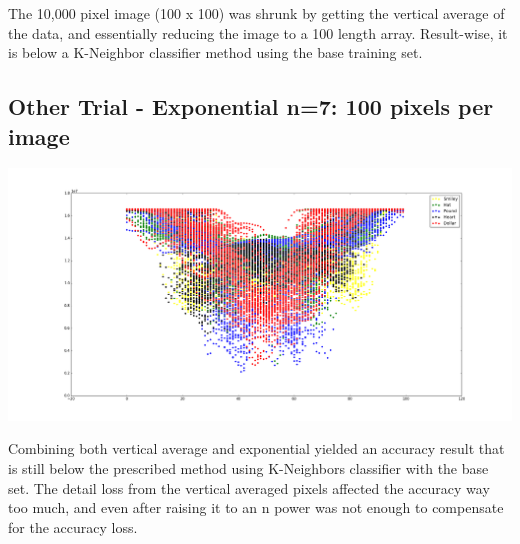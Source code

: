 \documentclass{article}
\begin{document}
  The 10,000 pixel image (100 x 100) was shrunk by getting the vertical average of the data, and essentially reducing the image to a 100 length array. Result-wise, it is below a K-Neighbor classifier method using the base training set.
  
  \subsection{Other Trial - Exponential n=7: 100 pixels per image}
  \includegraphics[width=1.1\textwidth]{figure_5.png}
   
   Combining both vertical average and exponential yielded an accuracy result that is still below the prescribed method using K-Neighbors classifier with the base set. The detail loss from the vertical averaged pixels affected the accuracy way too much, and even after raising it to an n power was not enough to compensate for the accuracy loss.
	  
\end{document}
